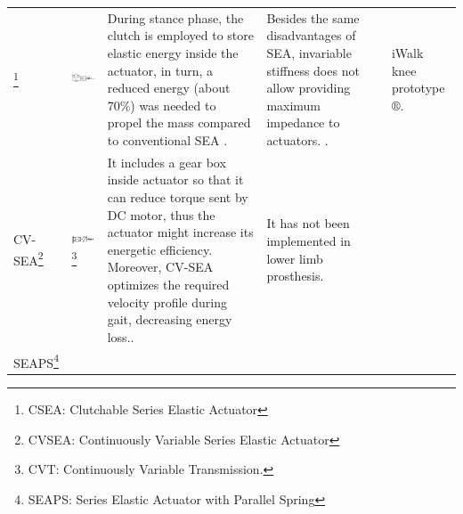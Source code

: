\documentclass[12pt,english]{article}
\providecommand{\tabularnewline}{\\}
\begin{document}
\begin{center}
\begin{longtable}{|>{\centering}p{15mm}|>{\centering}p{30mm}|>{\centering}p{40mm}|>{\centering}p{40mm}|>{\centering}p{24mm}|}
{\small{}-Transfemoral prosthesis prototype by Vanderbilt University \cite{Sup2008,Sup2009,Varol2010,Ha2011}.}\tabularnewline
\hline 
{\small{}CSEA}\footnote{CSEA: Clutchable Series Elastic Actuator}{\small{} } & {\small{}\vspace{15 mm}}{\small \par}

{\small{}\includegraphics[scale=0.4]{CSEA.png}} & {\small{}During stance phase, the clutch is employed to store elastic energy inside the actuator\cite{Rouse2014}, in turn, a reduced energy (about 70\%) was needed to propel the mass compared to conventional SEA 
\cite{Rouse2013}.} & {\small{}Besides the same disadvantages of SEA, invariable stiffness does not allow providing maximum impedance to actuators. \cite{Rouse2014}.} & {\small{} iWalk knee prototype$\circledR$.}\tabularnewline
\hline 
{\small{}CV-SEA}\footnote{CVSEA: Continuously Variable Series Elastic Actuator} & {\small{}\vspace{10 mm}}{\small \par}

{\small{}\includegraphics[scale=0.35]{CVSEA.PNG}}\footnote{{\small{}CVT: Continuously Variable Transmission.}} & {\small{}It includes a gear box inside actuator so that it can reduce torque sent by DC motor, thus the actuator might increase its energetic efficiency. Moreover, CV-SEA optimizes the required velocity profile during gait, decreasing energy loss.\cite{Mooney}.} & {\small{} It has not been implemented in lower limb prosthesis.} & \tabularnewline
\hline 
{\small{}SEAPS}\footnote{SEAPS: Series Elastic Actuator with Parallel Spring} & {\small{}\vspace{5 mm}}{\small \par}


\end{longtable}
\end{center}
\end{document}
